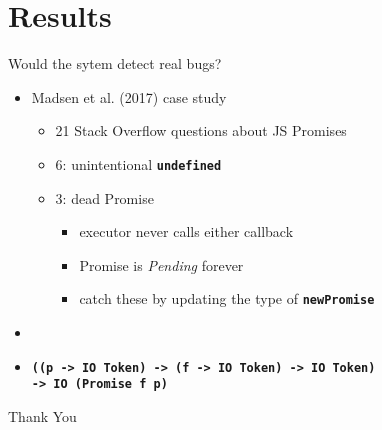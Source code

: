 \documentclass{beamer}
\newcommand{\lit}[1]{\textbf{\texttt{#1}}}
\begin{document}
\section{Results}

\begin{frame}
  \centering{\Large \insertsection}
\end{frame}


\begin{frame}
  \begin{block}{}
    Would the sytem detect real bugs?
  \end{block}
  \begin{itemize}
    \pause\item Madsen et al. (2017) case study
    \begin{itemize}
      \pause\item 21 Stack Overflow questions about JS Promises
      \pause\item 6: unintentional \lit{undefined} \pause {\huge \checkmark}
      \pause\item 3: dead Promise 
      \begin{itemize}
        \pause\item executor never calls either callback
        \pause\item Promise is \emph{Pending} forever
        \pause\item catch these by updating the type of \lit{newPromise}
      \end{itemize}
    \end{itemize}
    \pause\item\item\lit{((p -> IO Token) -> (f -> IO Token) -> IO Token)\\
        \qquad  -> IO (Promise f p)}
  \end{itemize}
\end{frame}

\begin{frame}
  \center \huge Thank You
\end{frame}
\end{document}
